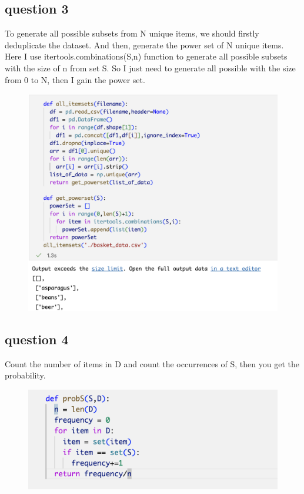 \documentclass{article}
\begin{document}
\subsection{question 3}
To generate all possible subsets from N unique items, we should firstly deduplicate the dataset. And then, generate the power set of N unique items. Here I use itertools.combinations(S,n) function to generate all possible subsets with the size of n from set S. So I just need to generate all possible with the size from 0 to N, then I gain the power set.
\begin{center}
\begin{figure}[H]
\centering
\includegraphics[width=14cm]{images/all items.png}
\end{figure}
\end{center}


\subsection{question 4}
Count the number of items in D and count the occurrences of S, then you get the probability. 
\begin{center}
\begin{figure}[H]
\centering
\includegraphics[width=13cm]{images/probS.png}
\end{figure}
\end{center}
\end{document}

